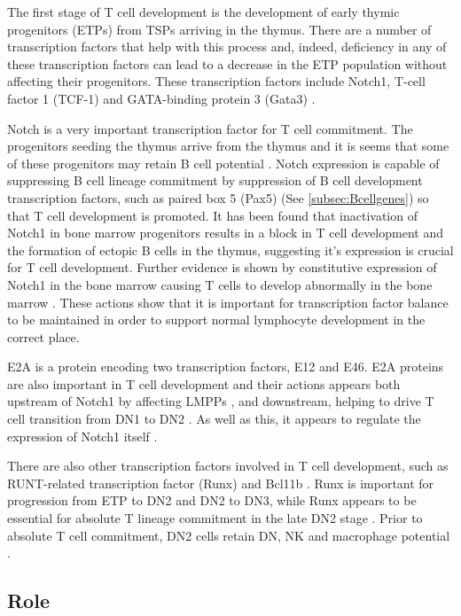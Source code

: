 The first stage of T cell development is the development of early thymic progenitors (ETPs) from TSPs arriving in the thymus.
There are a number of transcription factors that help with this process and, indeed, deficiency in any of these transcription factors can lead to a decrease in the ETP population without affecting their progenitors.
These transcription factors include Notch1, T-cell factor 1 (TCF-1) and GATA-binding protein 3 (Gata3) \citep{Sambandam2005, Naito2011, Weber2011, Hosoya2009}.

Notch is a very important transcription factor for T cell commitment.
The progenitors seeding the thymus arrive from the thymus and it is seems that some of these progenitors may retain B cell potential \citep{Porritt2004}.
Notch expression is capable of suppressing B cell lineage commitment by suppression of B cell development transcription factors, such as paired box 5 (Pax5) (See \cref{subsec:Bcellgenes}) so that T cell development is promoted.
It has been found that inactivation of Notch1 in bone marrow progenitors results in a block in T cell development and the formation of ectopic B cells in the thymus, suggesting it's expression is crucial for T cell development.
Further evidence is shown by constitutive expression of Notch1 in the bone marrow causing T cells to develop abnormally in the bone marrow \citep{Radtke2013}.
These actions show that it is important for transcription factor balance to be maintained in order to support normal lymphocyte development in the correct place.

E2A is a protein encoding two transcription factors, E12 and E46.
E2A proteins are also important in T cell development and their actions appears both upstream of Notch1 by affecting LMPPs \citep{Dias2008}, and downstream, helping to drive T cell transition from DN1 to DN2 \citep{Naito2011}.
As well as this, it appears to regulate the expression of Notch1 itself \citep{Dias2008}.

There are also other transcription factors involved in T cell development, such as RUNT-related transcription factor (Runx) and Bcl11b \citep{Naito2011, Liu2010}.
Runx is important for progression from ETP to DN2 and DN2 to DN3, while Runx appears to be essential for absolute T lineage commitment in the late DN2 stage \citep{Liu2010, Naito2011}. 
Prior to absolute T cell commitment, DN2 cells retain DN, NK and macrophage potential \citep{Naito2011}.

\subsection{Role}
\label{subsec:Tcellfunctions}

